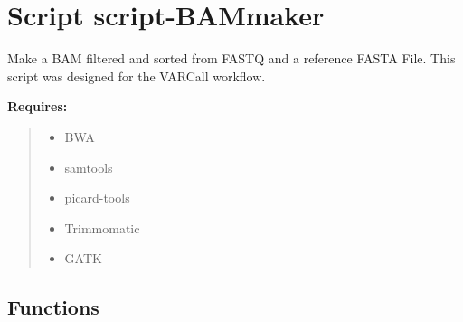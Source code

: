 %
%
%


\section{Script script-BAMmaker}

    \label{script-BAMmaker}
Make a BAM filtered and sorted from FASTQ and a reference FASTA File. This 
script was designed for the VARCall workflow.

\textbf{Requires:}
\begin{quote}
  \begin{itemize}

  \item
    \setlength{\parskip}{0.6ex}
BWA



  \item samtools



  \item picard-tools



  \item Trimmomatic



  \item GATK



\end{itemize}

\end{quote}



  \subsection{Functions}

    \label{script-BAMmaker:get_parser}

